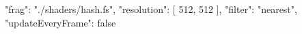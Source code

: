 {
	"frag": "./shaders/hash.fs",
	"resolution": [
		512,
		512
	],
	"filter": "nearest",
	"updateEveryFrame": false
}
